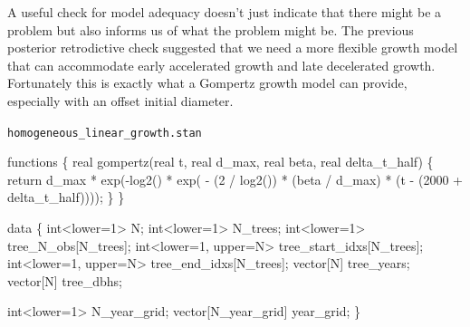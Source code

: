 \documentclass[
  letterpaper,
  DIV=11,
  numbers=noendperiod]{scrartcl}
\newenvironment{Shaded}{\begin{snugshade}}{\end{snugshade}}
\newcommand{\ControlFlowTok}[1]{\textcolor[rgb]{0.00,0.23,0.31}{#1}}
\newcommand{\DataTypeTok}[1]{\textcolor[rgb]{0.68,0.00,0.00}{#1}}
\newcommand{\DecValTok}[1]{\textcolor[rgb]{0.68,0.00,0.00}{#1}}
\newcommand{\KeywordTok}[1]{\textcolor[rgb]{0.00,0.23,0.31}{#1}}
\newcommand{\NormalTok}[1]{\textcolor[rgb]{0.00,0.23,0.31}{#1}}
\begin{document}
A useful check for model adequacy doesn't just indicate that there might
be a problem but also informs us of what the problem might be. The
previous posterior retrodictive check suggested that we need a more
flexible growth model that can accommodate early accelerated growth and
late decelerated growth. Fortunately this is exactly what a Gompertz
growth model can provide, especially with an offset initial diameter.

\begin{codelisting}

\caption{\texttt{homogeneous\_linear\_growth.stan}}

\begin{Shaded}
\begin{Highlighting}[]
\KeywordTok{functions}\NormalTok{ \{}
  \DataTypeTok{real}\NormalTok{ gompertz(}\DataTypeTok{real}\NormalTok{ t, }\DataTypeTok{real}\NormalTok{ d\_max, }\DataTypeTok{real}\NormalTok{ beta, }\DataTypeTok{real}\NormalTok{ delta\_t\_half) \{}
    \ControlFlowTok{return}\NormalTok{ d\_max * exp({-}log2() * exp( {-}   (}\DecValTok{2}\NormalTok{ / log2()) }
\NormalTok{                                        * (beta / d\_max) }
\NormalTok{                                        * (t {-} (}\DecValTok{2000}\NormalTok{ + delta\_t\_half))));}
\NormalTok{  \}}
\NormalTok{\}}

\KeywordTok{data}\NormalTok{ \{}
  \DataTypeTok{int}\NormalTok{\textless{}}\KeywordTok{lower}\NormalTok{=}\DecValTok{1}\NormalTok{\textgreater{} N;}
  \DataTypeTok{int}\NormalTok{\textless{}}\KeywordTok{lower}\NormalTok{=}\DecValTok{1}\NormalTok{\textgreater{} N\_trees;}
  \DataTypeTok{int}\NormalTok{\textless{}}\KeywordTok{lower}\NormalTok{=}\DecValTok{1}\NormalTok{\textgreater{} tree\_N\_obs[N\_trees];}
  \DataTypeTok{int}\NormalTok{\textless{}}\KeywordTok{lower}\NormalTok{=}\DecValTok{1}\NormalTok{, }\KeywordTok{upper}\NormalTok{=N\textgreater{} tree\_start\_idxs[N\_trees];}
  \DataTypeTok{int}\NormalTok{\textless{}}\KeywordTok{lower}\NormalTok{=}\DecValTok{1}\NormalTok{, }\KeywordTok{upper}\NormalTok{=N\textgreater{} tree\_end\_idxs[N\_trees];}
  \DataTypeTok{vector}\NormalTok{[N] tree\_years;}
  \DataTypeTok{vector}\NormalTok{[N] tree\_dbhs;}
  
  \DataTypeTok{int}\NormalTok{\textless{}}\KeywordTok{lower}\NormalTok{=}\DecValTok{1}\NormalTok{\textgreater{} N\_year\_grid;}
  \DataTypeTok{vector}\NormalTok{[N\_year\_grid] year\_grid;}
\NormalTok{\}}


\end{Highlighting}
\end{Shaded}
\end{codelisting}
\end{document}
